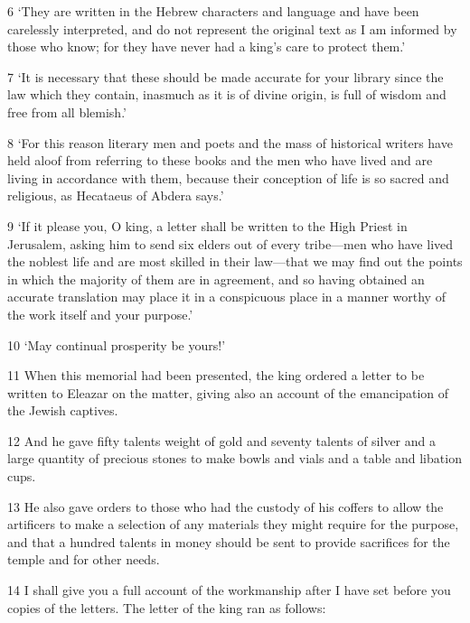 \par 6 ‘They are written in the Hebrew characters and language and have been carelessly interpreted, and do not represent the original text as I am informed by those who know; for they have never had a king's care to protect them.’

\par 7 ‘It is necessary that these should be made accurate for your library since the law which they contain, inasmuch as it is of divine origin, is full of wisdom and free from all blemish.’

\par 8 ‘For this reason literary men and poets and the mass of historical writers have held aloof from referring to these books and the men who have lived and are living in accordance with them, because their conception of life is so sacred and religious, as Hecataeus of Abdera says.’

\par 9 ‘If it please you, O king, a letter shall be written to the High Priest in Jerusalem, asking him to send six elders out of every tribe—men who have lived the noblest life and are most skilled in their law—that we may find out the points in which the majority of them are in agreement, and so having obtained an accurate translation may place it in a conspicuous place in a manner worthy of the work itself and your purpose.’

\par 10 ‘May continual prosperity be yours!’

\par 11 When this memorial had been presented, the king ordered a letter to be written to Eleazar on the matter, giving also an account of the emancipation of the Jewish captives.

\par 12 And he gave fifty talents weight of gold and seventy talents of silver and a large quantity of precious stones to make bowls and vials and a table and libation cups.

\par 13 He also gave orders to those who had the custody of his coffers to allow the artificers to make a selection of any materials they might require for the purpose, and that a hundred talents in money should be sent to provide sacrifices for the temple and for other needs.

\par 14 I shall give you a full account of the workmanship after I have set before you copies of the letters. The letter of the king ran as follows:

